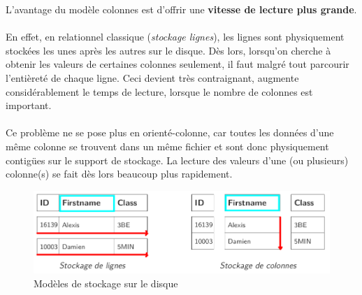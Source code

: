 \item{}
{\faux}
{
L'avantage du modèle colonnes est d'offrir une \textbf{vitesse de lecture plus grande}.
\paragraph{}
En effet, en relationnel classique (\textit{stockage lignes}), les lignes sont physiquement stockées les unes après les autres sur le disque. Dès lors, lorsqu'on cherche à obtenir les valeurs de certaines colonnes seulement, il faut malgré tout parcourir l'entièreté de chaque ligne. Ceci devient très contraignant, augmente considérablement le temps de lecture, lorsque le nombre de colonnes est important.
\paragraph{}
Ce problème ne se pose plus en orienté-colonne, car toutes les données d'une même colonne se trouvent dans un même fichier et sont donc physiquement contigües sur le support de stockage. La lecture des valeurs d'une (ou plusieurs) colonne(s) se fait dès lors beaucoup plus rapidement.
\begin{figure}[h!]
\center\includegraphics[scale=.35]{images/colonnes-stockage}
\caption{Modèles de stockage sur le disque \cite{ref1}}\label{colonnes-stockage}
\end{figure}
}
